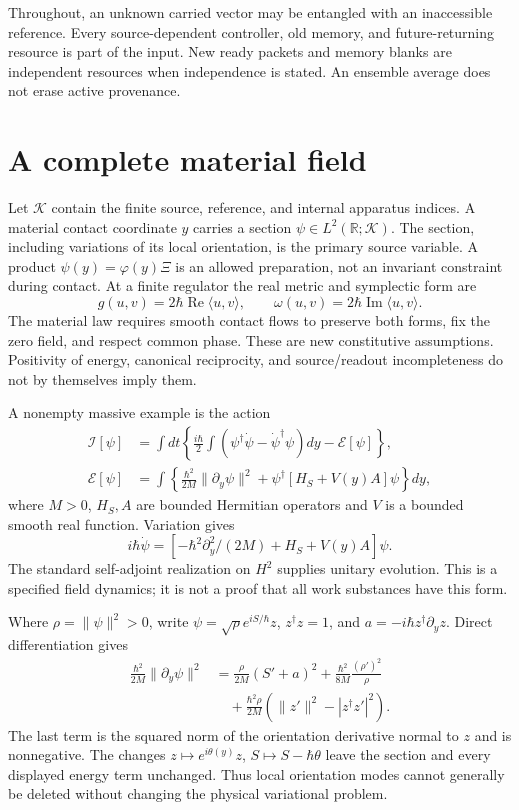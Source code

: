 \documentclass[11pt,oneside,openany]{book}
\theoremstyle{definition}
\theoremstyle{remark}\newtheorem{remark}[theorem]{Remark}
\begin{document}
Throughout, an unknown carried vector may be entangled with an inaccessible reference. Every source-dependent controller, old memory, and future-returning resource is part of the input. New ready packets and memory blanks are independent resources when independence is stated. An ensemble average does not erase active provenance.

\section{A complete material field}

Let $\mathcal K$ contain the finite source, reference, and internal apparatus indices. A material contact coordinate $y$ carries a section $\psi\in L^2(\mathbb R;\mathcal K)$. The section, including variations of its local orientation, is the primary source variable. A product $\psi(y)=\varphi(y)\Xi$ is an allowed preparation, not an invariant constraint during contact. At a finite regulator the real metric and symplectic form are
\begin{equation}
 g(u,v)=2\hbar\operatorname{Re}\langle u,v\rangle,
 \qquad \omega(u,v)=2\hbar\operatorname{Im}\langle u,v\rangle.
 \label{mat:metric}
\end{equation}
The material law requires smooth contact flows to preserve both forms, fix the zero field, and respect common phase. These are new constitutive assumptions. Positivity of energy, canonical reciprocity, and source/readout incompleteness do not by themselves imply them.

A nonempty massive example is the action
\begin{align}
 \mathcal I[\psi]&=\int dt\left\{\frac{i\hbar}{2}
 \int(\psi^\dagger\dot\psi-\dot\psi^\dagger\psi)dy-\mathcal E[\psi]\right\},\\
 \mathcal E[\psi]&=\int\left\{\frac{\hbar^2}{2M}\|\partial_y\psi\|^2
       +\psi^\dagger[H_S+V(y)A]\psi\right\}dy,
 \label{mat:action}
\end{align}
where $M>0$, $H_S,A$ are bounded Hermitian operators and $V$ is a bounded smooth real function. Variation gives
\[
 i\hbar\dot\psi=[-\hbar^2\partial_y^2/(2M)+H_S+V(y)A]\psi.
\]
The standard self-adjoint realization on $H^2$ supplies unitary evolution. This is a specified field dynamics; it is not a proof that all work substances have this form.

Where $\rho=\|\psi\|^2>0$, write $\psi=\sqrt\rho e^{iS/\hbar}z$, $z^\dagger z=1$, and $a=-i\hbar z^\dagger\partial_yz$. Direct differentiation gives
\begin{align}
 \frac{\hbar^2}{2M}\|\partial_y\psi\|^2
 &=\frac\rho{2M}(S'+a)^2+\frac{\hbar^2}{8M}\frac{(\rho')^2}\rho\\
 &\quad+\frac{\hbar^2\rho}{2M}
   (\|z'\|^2-|z^\dagger z'|^2).
 \label{mat:strain}
\end{align}
The last term is the squared norm of the orientation derivative normal to $z$ and is nonnegative. The changes $z\mapsto e^{i\theta(y)}z$, $S\mapsto S-\hbar\theta$ leave the section and every displayed energy term unchanged. Thus local orientation modes cannot generally be deleted without changing the physical variational problem.
\end{document}
